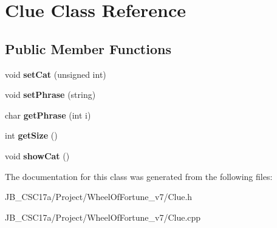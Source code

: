 \hypertarget{class_clue}{}\section{Clue Class Reference}
\label{class_clue}
\subsection*{Public Member Functions}
\begin{DoxyCompactItemize}
\item 
\hypertarget{class_clue_a5b4f0e5acadc421e342ba051ddd44f31}{}\label{class_clue_a5b4f0e5acadc421e342ba051ddd44f31} 
void {\bfseries set\+Cat} (unsigned int)
\item 
\hypertarget{class_clue_a6218cef7fc152cdda791e017f53ff2ce}{}\label{class_clue_a6218cef7fc152cdda791e017f53ff2ce} 
void {\bfseries set\+Phrase} (string)
\item 
\hypertarget{class_clue_a4026c0a49ed3fe8f51ccc739ed4c12a7}{}\label{class_clue_a4026c0a49ed3fe8f51ccc739ed4c12a7} 
char {\bfseries get\+Phrase} (int i)
\item 
\hypertarget{class_clue_aaef3a4bee9939abf3644d4215c3d507d}{}\label{class_clue_aaef3a4bee9939abf3644d4215c3d507d} 
int {\bfseries get\+Size} ()
\item 
\hypertarget{class_clue_ae330074934125b8033619fd1b225af89}{}\label{class_clue_ae330074934125b8033619fd1b225af89} 
void {\bfseries show\+Cat} ()
\end{DoxyCompactItemize}


The documentation for this class was generated from the following files\+:\begin{DoxyCompactItemize}
\item 
J\+B\+\_\+\+C\+S\+C17a/\+Project/\+Wheel\+Of\+Fortune\+\_\+v7/Clue.\+h\item 
J\+B\+\_\+\+C\+S\+C17a/\+Project/\+Wheel\+Of\+Fortune\+\_\+v7/Clue.\+cpp\end{DoxyCompactItemize}
